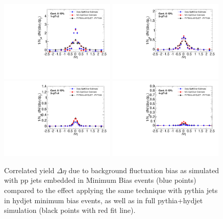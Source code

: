 \begin{figure}[h!]
\begin{center}
\includegraphics[width=0.49\textwidth]{figures/JFF_SpillOver/Data_Closures_TrkPt1_TrkPt2.pdf}
\includegraphics[width=0.49\textwidth]{figures/JFF_SpillOver/Data_Closures_TrkPt2_TrkPt3.pdf}
\includegraphics[width=0.49\textwidth]{figures/JFF_SpillOver/Data_Closures_TrkPt3_TrkPt4.pdf}
\includegraphics[width=0.49\textwidth]{figures/JFF_SpillOver/Data_Closures_TrkPt4_TrkPt8.pdf}
\caption[Data-driven check of correlated $\Delta\eta$ yields attributed to background fluctuation bias]{Correlated yield $\Delta\eta$ due to background fluctuation bias as simulated with pp jets embedded in Minimum Bias events (blue points) compared to the effect applying the same technique with {\sc pythia}  jets in {\sc hydjet}  minimum bias events, as well as in full {\sc pythia+hydjet} simulation (black points with red fit line).}
\label{fig:data_spill_bins}
\end{center}
\end{figure}
 
